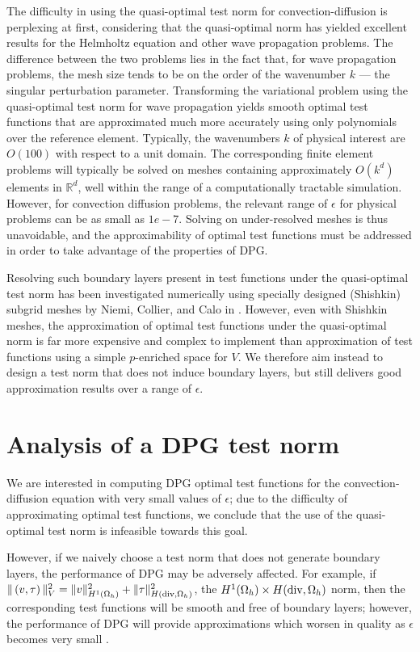 The difficulty in using the quasi-optimal test norm for convection-diffusion is perplexing at first, considering that the quasi-optimal norm has yielded excellent results for the Helmholtz equation and other wave propagation problems.  The difference between the two problems lies in the fact that, for wave propagation problems, the mesh size tends to be on the order of the wavenumber $k$ --- the singular perturbation parameter. Transforming the variational problem using the quasi-optimal test norm for wave propagation yields smooth optimal test functions that are approximated much more accurately using only polynomials over the reference element. Typically, the wavenumbers $k$ of physical interest are $O(100)$ with respect to a unit domain. The corresponding finite element problems will typically be solved on meshes containing approximately $O\!\left(k^d\right)$ elements in $\mathbb{R}^d$, well within the range of a computationally tractable simulation. However, for convection diffusion problems, the relevant range of $\epsilon$ for physical problems can be as small as $1e-7$. Solving on under-resolved meshes is thus unavoidable, and the approximability of optimal test functions must be addressed in order to take advantage of the properties of DPG.

Resolving such boundary layers present in test functions under the quasi-optimal test norm has been investigated numerically using specially designed (Shishkin) subgrid meshes by Niemi, Collier, and Calo in
\cite{DBLP:journals/procedia/NiemiCC11}.  However, even with Shishkin meshes, the approximation of optimal test functions under the quasi-optimal norm is far more expensive and complex to implement than approximation of test functions using a simple $p$-enriched space for $V$. We therefore aim instead to design a test norm that does not induce boundary layers, but still delivers good approximation results over a range of $\epsilon$.  

\section{Analysis of a DPG test norm}
We are interested in computing DPG optimal test functions for the convection-diffusion equation with very small values of $\epsilon$; due to the difficulty of approximating optimal test functions, we conclude that the use of the quasi-optimal test norm is infeasible towards this goal. 

However, if we naively choose a test norm that does not generate boundary layers, the performance of DPG may be adversely affected. For example, if $\|\left(v,\tau\right)\|_V^2 = \|v\|_{H^1(\Omega_h)}^2 + \|\tau\|^2_{H({\rm div},\Omega_h)}$, the $H^1(\Omega_h)\times H({\rm div},\Omega_h)$ norm, then the corresponding test functions will be smooth and free of boundary layers; however, the performance of DPG will provide approximations which worsen in quality as $\epsilon$ becomes very small \cite{DPG3,DPGrobustness}. 

